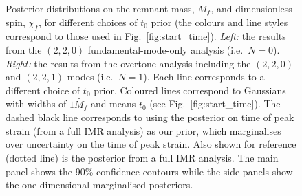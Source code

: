 \begin{figure}[t]
    \captionsetup[subfigure]{labelformat=empty}
    \centering
    \;
    \;
    \caption[Posteriors on the GW150914 remnant mass and spin for different choices of the ringdown start-time prior]{  
    Posterior distributions on the remnant mass, $M_f$, and dimensionless spin, $\chi_f$, for different choices of $t_0$ prior (the colours and line styles correspond to those used in Fig.~\ref{fig:start_time}). 
    \emph{Left:} the results from the $(2,2,0)$ fundamental-mode-only analysis (i.e.\ $N=0$).
    \emph{Right:} the results from the overtone analysis including the $(2,2,0)$ and $(2,2,1)$ modes (i.e.\ $N=1$).
    Each line corresponds to a different choice of $t_0$ prior. 
    Coloured lines correspond to Gaussians with widths of $1 \tilde{M_f}$ and means $\bar{t_0}$ (see Fig.~\ref{fig:start_time}).
    The dashed black line corresponds to using the posterior on time of peak strain (from a full IMR analysis) as our prior, which marginalises over uncertainty on the time of peak strain.
    Also shown for reference (dotted line) is the posterior from a full IMR analysis. 
    The main panel shows the 90\% confidence contours while the side panels show the one-dimensional marginalised posteriors.
    }
    \label{fig:mass_spin_post}
\end{figure}

